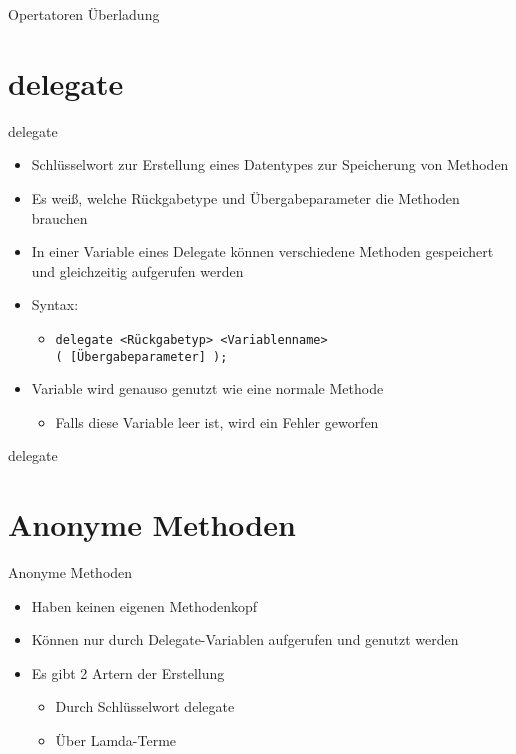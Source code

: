 \begin{frame}{Opertatoren Überladung}
	
	
\end{frame}

\section{delegate}
\begin{frame}{delegate}
	\begin{itemize}
		\item Schlüsselwort zur Erstellung eines Datentypes zur Speicherung von Methoden
		\item Es weiß, welche Rückgabetype und Übergabeparameter die Methoden brauchen
		\item In einer Variable eines Delegate können verschiedene Methoden gespeichert und gleichzeitig aufgerufen werden
		\item Syntax:
		\begin{itemize}
			\item \texttt{delegate \alert{<Rückgabetyp> <Variablenname>}\\( \alert{[Übergabeparameter]} );}
		\end{itemize}
		\item Variable wird genauso genutzt wie eine normale Methode
		\begin{itemize}
			\item Falls diese Variable leer ist, wird ein Fehler geworfen
		\end{itemize}
	\end{itemize}
\end{frame}

\begin{frame}{delegate}
	
	
\end{frame}

\section{Anonyme Methoden}
\begin{frame}{Anonyme Methoden}
	\begin{itemize}
		\item Haben keinen eigenen Methodenkopf
		\item Können nur durch Delegate-Variablen aufgerufen und genutzt werden
		\item Es gibt 2 Artern der Erstellung
		\begin{itemize}
			\item Durch Schlüsselwort \alert{delegate}
			\item Über Lamda-Terme
		\end{itemize}	
	\end{itemize}
\end{frame}

